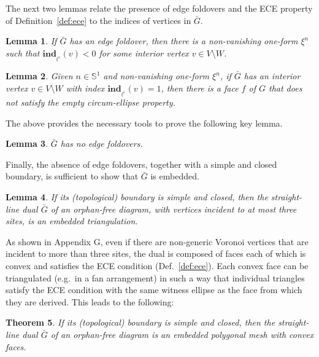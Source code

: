 \documentclass[11pt]{article}
\newtheorem{theorem}{Theorem}[section]
\newtheorem{lemma}[theorem]{Lemma}
\begin{document}
The next two lemmas relate the presence of edge foldovers and 
the ECE property of Definition~\ref{def:ece}  to the indices of vertices in $\bar{G}$. 





\begin{lemma}\label{lem:index-1}
If $\bar{G}$ has an edge foldover, then there is a non-vanishing one-form $\xi^n$ such
that $\mathbf{ind}_{_{\xi^n}}(v) < 0$ for some interior vertex $v\in V\setminus W$. \end{lemma}


\begin{lemma}\label{lem:index1}
Given $n\in\mathbb{S}^1$ and non-vanishing one-form $\xi^n$, if $\bar{G}$ has an interior vertex $v\in V\setminus W$ with index
$\mathbf{ind}_{_{\xi^n}}(v)=1$, then there is a face $f$ of
$G$ that does not satisfy the empty circum-ellipse property. 
\end{lemma}

The above provides the necessary tools to prove the following key lemma. 


\begin{lemma}\label{lem:ef}
$\bar{G}$ has no edge foldovers. 
\end{lemma}



Finally, the absence of edge foldovers, together with a simple and closed boundary, 
is sufficient to show that $\bar{G}$ is 
embedded.





\begin{lemma}\label{lem:main-weak}
If its (topological) boundary is simple and closed, then the straight-line dual $\bar{G}$ of an orphan-free diagram, with vertices incident to at most three sites, is an embedded triangulation. 
\end{lemma}

As shown in Appendix G, even if there are non-generic Voronoi vertices that are incident to more than three sites, the dual is composed of faces each of which is convex and satisfies the ECE condition (Def.~\ref{def:ece}). Each convex face can be triangulated (e.g.\ in a fan arrangement) in such a way that individual triangles satisfy the ECE condition with the same witness ellipse as the face from which they are derived. This leads to the following:


\begin{theorem}\label{th:main}
If its (topological) boundary is simple and closed, then the straight-line dual $\bar{G}$ of an orphan-free diagram is an  embedded polygonal mesh with convex faces. 
\end{theorem}
\end{document}
